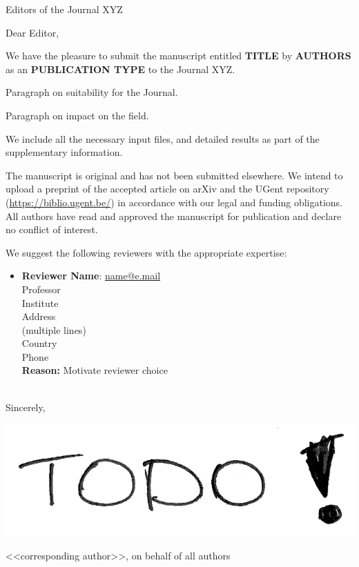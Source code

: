 \documentclass[11pt]{letter}
\begin{document}
\begin{letter}{Editors of the Journal XYZ}

\opening{Dear Editor,}

We have the pleasure to submit the manuscript entitled
\textbf{TITLE}
by \textbf{AUTHORS} as an \textbf{PUBLICATION TYPE} to the Journal XYZ.

Paragraph on suitability for the Journal.

Paragraph on impact on the field.

We include all the necessary input files, and detailed results as part of the supplementary information.

The manuscript is original and has not been submitted elsewhere.
We intend to upload a preprint of the accepted article on arXiv and the UGent repository (\url{https://biblio.ugent.be/}) in accordance with our legal and funding obligations.
All authors have read and approved the manuscript for publication and declare no conflict of interest.

We suggest the following reviewers with the appropriate expertise:
%
\begin{itemize}[itemsep=12pt]
    \item
    \begin{minipage}[t]{\linewidth}
    \textbf{Reviewer Name}: \href{mailto:name@e.mail}{name@e.mail} \\
    Professor \\
    Institute \\
    Address \\
    (multiple lines) \\
    Country \\
    Phone \\
    \textbf{Reason:} Motivate reviewer choice
    \end{minipage}
\end{itemize}

\-\\[1em]
Sincerely,

\includegraphics[height=8\medskipamount]{signature}

<<corresponding author>>, on behalf of all authors


\end{letter}
\end{document}
